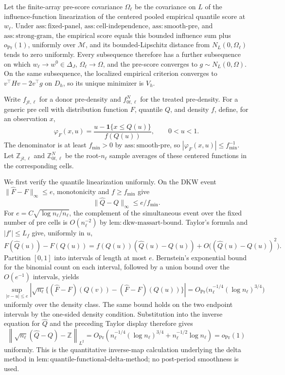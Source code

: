 Let the finite-array pre-score covariance \(\Omega_\ell\) be the covariance on \(L\) of the influence-function linearization of the centered pooled empirical quantile score at \(w_\ell\).  Under \(\mathrm{ass:fixed\mbox{-}panel}\), \(\mathrm{ass:cell\mbox{-}independence}\), \(\mathrm{ass:smooth\mbox{-}pre}\), and \(\mathrm{ass:strong\mbox{-}gram}\), the empirical score equals this bounded influence sum plus \(o_{\Pr}(1)\), uniformly over \(\mathcal M\), and its bounded-Lipschitz distance from \(N_L(0,\Omega_\ell)\) tends to zero uniformly.  Every subsequence therefore has a further subsequence on which \(w_\ell\to w^0\in\Delta_J\), \(\Omega_\ell\to\Omega\), and the pre-score converges to \(g\sim N_L(0,\Omega)\).  On the same subsequence, the localized empirical criterion converges to \(v^\top Hv-2v^\top g\) on \(D_h\), so its unique minimizer is \(V_h\).

Write \(f_{jt,\ell}\) for a donor pre-density and \(f^N_{0t,\ell}\) for the treated pre-density.  For a generic pre cell with distribution function \(F\), quantile \(Q\), and density \(f\), define, for an observation \(x\),
\[
 \varphi_{F}(x,u)=
 \frac{u-\mathbf 1\{x\leq Q(u)\}}{f(Q(u))},
 \qquad 0<u<1.
\]
The denominator is at least \(f_{\min}>0\) by \(\mathrm{ass:smooth\mbox{-}pre}\), so \(|\varphi_F(x,u)|\leq f_{\min}^{-1}\).  Let \(\mathbb Z_{jt,\ell}\) and \(\mathbb Z^N_{0t,\ell}\) be the root-\(n_\ell\) sample averages of these centered functions in the corresponding cells.

We first verify the quantile linearization uniformly.  On the DKW event
\(\|\widehat F-F\|_\infty\leq e\), monotonicity and \(f\geq f_{\min}\) give
\[
 \|\widehat Q-Q\|_\infty\leq e/f_{\min}.
\]
For \(e=C\sqrt{\log n_\ell/n_\ell}\), the complement of the simultaneous event over the fixed number of pre cells is \(O(n_\ell^{-2})\) by \(\mathrm{lem:dkw\mbox{-}massart\mbox{-}bound}\).  Taylor's formula and \(|f'|\leq L_f\) give, uniformly in \(u\),
\[
 F(\widehat Q(u))-F(Q(u))
 =f(Q(u))(\widehat Q(u)-Q(u))
 +O\bigl((\widehat Q(u)-Q(u))^2\bigr).
\]
Partition \([0,1]\) into intervals of length at most \(e\).  Bernstein's exponential bound for the binomial count on each interval, followed by a union bound over the \(O(e^{-1})\) intervals, yields
\[
 \sup_{|v-u|\leq e}
 \left|\sqrt{n_\ell}\{(\widehat F-F)(Q(v))
              -(\widehat F-F)(Q(u))\}\right|
 =O_{\Pr}\bigl(n_\ell^{-1/4}(\log n_\ell)^{3/4}\bigr)
\]
uniformly over the density class.  The same bound holds on the two endpoint intervals by the one-sided density condition.  Substitution into the inverse equation for \(\widehat Q\) and the preceding Taylor display therefore gives
\[
 \left\|\sqrt{n_\ell}(\widehat Q-Q)-\mathbb Z\right\|_{L^2}
 =O_{\Pr}\left(n_\ell^{-1/4}(\log n_\ell)^{3/4}
       +n_\ell^{-1/2}\log n_\ell\right)=o_{\Pr}(1)
\]
uniformly.  This is the quantitative inverse-map calculation underlying the delta method in \(\mathrm{lem:quantile\mbox{-}functional\mbox{-}delta\mbox{-}method}\); no post-period smoothness is used.

